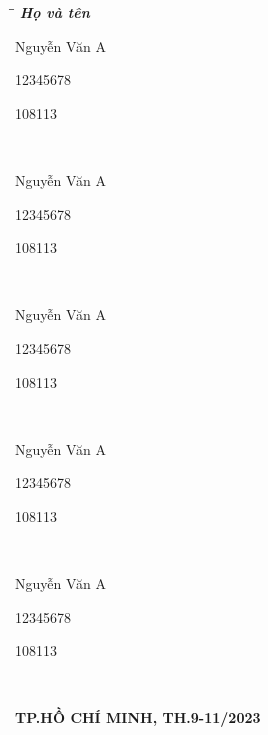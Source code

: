 \documentclass[a4paper]{article}
\begin{document}
\begin{titlepage}
\begin{tabbing}
\hspace{8cm}\=\hspace{3cm}\=\hspace{3cm} \kill
{\it \textbf{Họ và tên}}\\
\begin{bfseries}Nguyễn Văn A \end{bfseries}\> \begin{bfseries}12345678\end{bfseries}\> \begin{bfseries}108113\end{bfseries}\\
\begin{bfseries}Nguyễn Văn A\end{bfseries}\> \begin{bfseries}12345678\end{bfseries}\> \begin{bfseries}108113\end{bfseries}\\
\begin{bfseries}Nguyễn Văn A\end{bfseries}\> \begin{bfseries}12345678\end{bfseries}\> \begin{bfseries}108113\end{bfseries}\\
\begin{bfseries}Nguyễn Văn A\end{bfseries}\> \begin{bfseries}12345678\end{bfseries}\> \begin{bfseries}108113\end{bfseries}\\
\begin{bfseries}Nguyễn Văn A\end{bfseries}\> \begin{bfseries}12345678\end{bfseries}\> \begin{bfseries}108113\end{bfseries}\\

\end{tabbing}
\vspace{10pt}
\begin{center}
    \textbf{TP.HỒ CHÍ MINH, TH.9-11/2023}
\end{center}
\end{titlepage}
\end{document}
